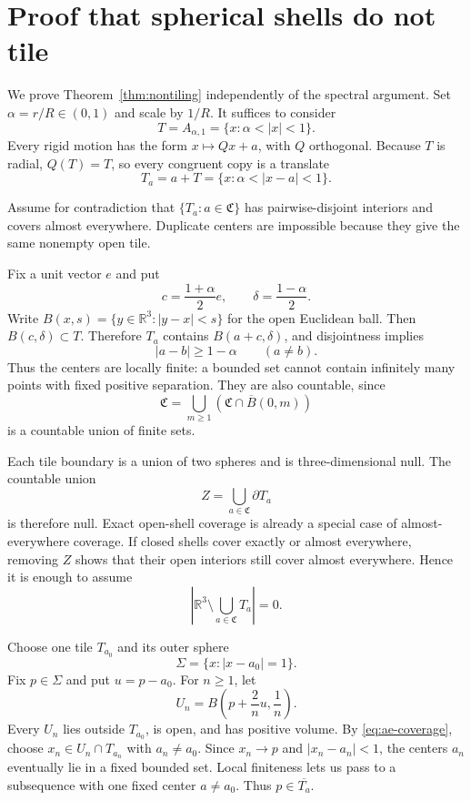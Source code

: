 \documentclass[11pt]{article}
\numberwithin{equation}{section}
\theoremstyle{definition}
\theoremstyle{remark}
\newcommand{\R}{\mathbb R}
\begin{document}
\section{Proof that spherical shells do not tile}

We prove Theorem~\ref{thm:nontiling} independently of the spectral argument.
Set \(\alpha=r/R\in(0,1)\) and scale by \(1/R\).  It suffices to consider
\[
  T=A_{\alpha,1}=\{x:\alpha<|x|<1\}.
\]
Every rigid motion has the form \(x\mapsto Qx+a\), with \(Q\) orthogonal.
Because \(T\) is radial, \(Q(T)=T\), so every congruent copy is a translate
\[
  T_a=a+T=\{x:\alpha<|x-a|<1\}.
\]

Assume for contradiction that \(\{T_a:a\in\mathfrak C\}\) has
pairwise-disjoint interiors and covers almost everywhere.  Duplicate centers
are impossible because they give the same nonempty open tile.

Fix a unit vector \(e\) and put
\[
  c=\frac{1+\alpha}{2}e,
  \qquad
  \delta=\frac{1-\alpha}{2}.
\]
Write \(B(x,s)=\{y\in\R^3:|y-x|<s\}\) for the open Euclidean ball.
Then \(B(c,\delta)\subset T\).  Therefore \(T_a\) contains
\(B(a+c,\delta)\), and disjointness implies
\begin{equation}
  |a-b|\ge1-\alpha
  \qquad(a\ne b).
  \label{eq:center-separation}
\end{equation}
Thus the centers are locally finite: a bounded set cannot contain infinitely
many points with fixed positive separation.  They are also countable, since
\[
  \mathfrak C
  =\bigcup_{m\ge1}(\mathfrak C\cap\overline B(0,m))
\]
is a countable union of finite sets.

Each tile boundary is a union of two spheres and is three-dimensional null.
The countable union
\[
  Z=\bigcup_{a\in\mathfrak C}\partial T_a
\]
is therefore null.  Exact open-shell coverage is already a special case of
almost-everywhere coverage.  If closed shells cover exactly or almost
everywhere, removing \(Z\) shows that their open interiors still cover almost
everywhere.  Hence it is enough to assume
\begin{equation}
  \left|\R^3\setminus\bigcup_{a\in\mathfrak C}T_a\right|=0.
  \label{eq:ae-coverage}
\end{equation}

Choose one tile \(T_{a_0}\) and its outer sphere
\[
  \Sigma=\{x:|x-a_0|=1\}.
\]
Fix \(p\in\Sigma\) and put \(u=p-a_0\).  For \(n\ge1\), let
\[
  U_n=B\left(p+\frac2n u,\frac1n\right).
\]
Every \(U_n\) lies outside \(T_{a_0}\), is open, and has positive volume.
By \eqref{eq:ae-coverage}, choose \(x_n\in U_n\cap T_{a_n}\) with
\(a_n\ne a_0\).  Since \(x_n\to p\) and \(|x_n-a_n|<1\), the centers
\(a_n\) eventually lie in a fixed bounded set.  Local finiteness lets us
pass to a subsequence with one fixed center \(a\ne a_0\).  Thus
\(p\in\overline{T_a}\).
\end{document}

